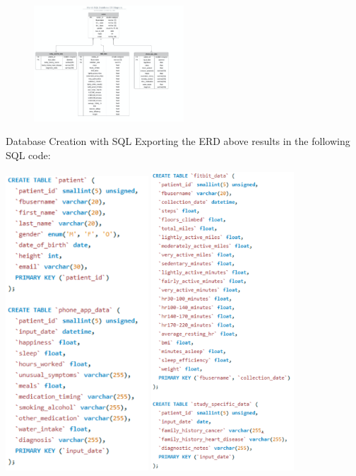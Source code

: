 \documentclass[]{book}
\begin{document}
\begin{figure}
\centering
\includegraphics[width=0.50000\textwidth]{./images/entity.png}
\caption{}
\end{figure}

Database Creation with SQL Exporting the ERD above results in the
following SQL code:

\includegraphics[width=0.40000\textwidth]{./images/a1.png}
\includegraphics[width=0.40000\textwidth]{./images/a2.png}
\end{document}

